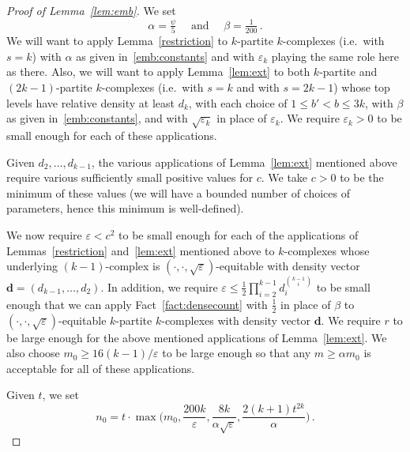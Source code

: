 \documentclass[12pt,a4paper]{amsart}
\let\eps\varepsilon
\begin{document}
\begin{proof}[Proof of Lemma~\ref{lem:emb}]
We set
\begin{equation}\label{emb:constants}
  \alpha=\tfrac{\psi}{5}\quad\text{ and }\quad\beta=\tfrac{1}{200}\,.
\end{equation}
We will want to apply Lemma~\ref{restriction} to $k$-partite $k$-complexes
(i.e.~with $s=k$) with $\alpha$ as given in~\eqref{emb:constants} and with 
$\eps_k$ playing the same role here as there. Also, we will
want to apply Lemma~\ref{lem:ext} to both $k$-partite and
$(2k-1)$-partite $k$-complexes (i.e.~with $s=k$ and with $s=2k-1$) whose
top levels have relative density at least $d_k$, with each choice of $1\le b'<b\le 3k$, 
with $\beta$ as given in~\eqref{emb:constants}, and with $\sqrt{\eps_k}$ in place of $\eps_k$. 
We require $\eps_k > 0$ to be small enough for each of these applications.

Given $d_2,\ldots,d_{k-1}$, the various applications of Lemma~\ref{lem:ext}
mentioned above require various sufficiently small positive values for $c$. We take $c>0$ to be the minimum of these values (we will have a bounded number of choices of parameters, hence this minimum is well-defined).

We now require $\eps<c^2$ to be small enough for each of the applications
of Lemmas~\ref{restriction} and~\ref{lem:ext} mentioned above to
$k$-complexes whose underlying $(k-1)$-complex is
$(\cdot,\cdot,\sqrt{\eps})$-equitable with density vector
$\mathbf{d}=(d_{k-1},\ldots,d_2)$. In addition, we require 
$\eps\le\tfrac12\prod_{i=2}^{k-1}d_i^{\binom{k-1}{i}}$ to be
small enough that we can apply Fact~\ref{fact:densecount} with $\tfrac{1}{2}$ in place of $\beta$ to
$(\cdot,\cdot,\sqrt{\eps})$-equitable $k$-partite $k$-complexes
with density vector $\mathbf{d}$.
We require $r$ to be large enough for the above mentioned applications of
Lemma~\ref{lem:ext}. We also choose $m_0\ge 16(k-1)/\eps$ to be large enough so that any $m\ge
\alpha m_0$ is acceptable for all of these applications.

Given $t$, we set
\begin{equation}\label{emb:n0}
  n_0=t\cdot\max\Big(m_0,\frac{200k}{\eps},\frac{8k}{\alpha\sqrt{\eps}},\frac{2(k+1)t^{2k}}{\alpha}\Big)\,.
\end{equation}


\end{proof}
\end{document}
